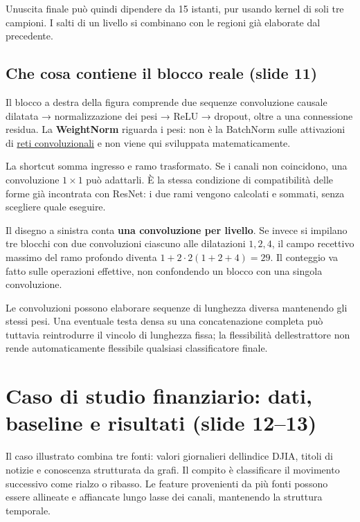 \documentclass[11pt,a4paper,oneside,openany]{book}
\begin{document}
Un\textquotesingle uscita finale può quindi dipendere da 15 istanti, pur usando kernel di soli tre campioni. I salti di un livello si combinano con le regioni già elaborate dal precedente.

\subsection{Che cosa contiene il blocco reale (slide 11)}\label{f04-r218}

Il blocco a destra della figura comprende due sequenze convoluzione causale dilatata → normalizzazione dei pesi → ReLU → dropout, oltre a una connessione residua. La \textbf{WeightNorm} riguarda i pesi: non è la BatchNorm sulle attivazioni di \hyperref[fonte02]{reti convoluzionali} e non viene qui sviluppata matematicamente.

La shortcut somma ingresso e ramo trasformato. Se i canali non coincidono, una convoluzione \(1\times1\) può adattarli. È la stessa condizione di compatibilità delle forme già incontrata con ResNet: i due rami vengono calcolati e sommati, senza scegliere quale eseguire.

Il disegno a sinistra conta \textbf{una convoluzione per livello}. Se invece si impilano tre blocchi con due convoluzioni ciascuno alle dilatazioni \(1,2,4\), il campo recettivo massimo del ramo profondo diventa \(1+2\cdot2(1+2+4)=29\). Il conteggio va fatto sulle operazioni effettive, non confondendo un blocco con una singola convoluzione.

Le convoluzioni possono elaborare sequenze di lunghezza diversa mantenendo gli stessi pesi. Una eventuale testa densa su una concatenazione completa può tuttavia reintrodurre il vincolo di lunghezza fissa; la flessibilità dell\textquotesingle estrattore non rende automaticamente flessibile qualsiasi classificatore finale.

\section{Caso di studio finanziario: dati, baseline e risultati (slide 12--13)}\label{f04-r228}

Il caso illustrato combina tre fonti: valori giornalieri dell\textquotesingle indice DJIA, titoli di notizie e conoscenza strutturata da grafi. Il compito è classificare il movimento successivo come rialzo o ribasso. Le feature provenienti da più fonti possono essere allineate e affiancate lungo l\textquotesingle asse dei canali, mantenendo la struttura temporale.
\end{document}
